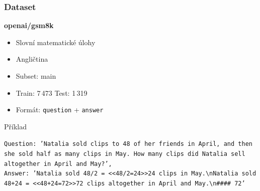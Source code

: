 \begin{frame}
  \frametitle{Dataset}

  

  \textbf{openai/gsm8k}

  \vspace{0.25cm}

  \begin{itemize}
    \item Slovní matematické úlohy
    \item Angličtina
    \item Subset: main
    \item Train: 7\,473 \quad Test: 1\,319
    \item Formát: \texttt{question} + \texttt{answer}
  \end{itemize}

  \vspace{0.3cm}

  \begin{block}{Příklad}

\texttt{Question: 'Natalia sold clips to 48 of her friends in April, and then she sold half as many clips in May. How many clips did Natalia sell altogether in April and May?',}\\
\texttt{Answer: 'Natalia sold 48/2 = <<48/2=24>>24 clips in May.\textbackslash nNatalia sold 48+24 = <<48+24=72>>72 clips altogether in April and May.\textbackslash n\#\#\#\# 72'}\\

\end{block}




\end{frame}






